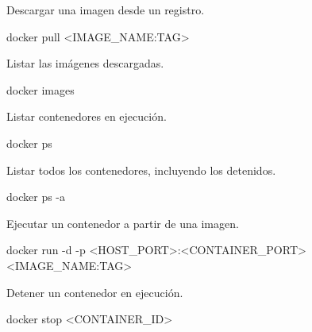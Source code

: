 \documentclass[
  a4paper,
  DIV=11,
  numbers=noendperiod,
  onepage,
  openany]{scrreprt}
\newenvironment{Shaded}{\begin{snugshade}}{\end{snugshade}}
\newcommand{\AttributeTok}[1]{\textcolor[rgb]{0.40,0.45,0.13}{#1}}
\newcommand{\ExtensionTok}[1]{\textcolor[rgb]{0.00,0.23,0.31}{#1}}
\newcommand{\NormalTok}[1]{\textcolor[rgb]{0.00,0.23,0.31}{#1}}
\newcommand{\OperatorTok}[1]{\textcolor[rgb]{0.37,0.37,0.37}{#1}}
\begin{document}
Descargar una imagen desde un registro.

\begin{Shaded}
\begin{Highlighting}[]
\ExtensionTok{docker}\NormalTok{ pull }\OperatorTok{\textless{}}\NormalTok{IMAGE\_NAME:TAG}\OperatorTok{\textgreater{}}
\end{Highlighting}
\end{Shaded}

Listar las imágenes descargadas.

\begin{Shaded}
\begin{Highlighting}[]
\ExtensionTok{docker}\NormalTok{ images}
\end{Highlighting}
\end{Shaded}

Listar contenedores en ejecución.

\begin{Shaded}
\begin{Highlighting}[]
\ExtensionTok{docker}\NormalTok{ ps}
\end{Highlighting}
\end{Shaded}

Listar todos los contenedores, incluyendo los detenidos.

\begin{Shaded}
\begin{Highlighting}[]
\ExtensionTok{docker}\NormalTok{ ps }\AttributeTok{{-}a}
\end{Highlighting}
\end{Shaded}

Ejecutar un contenedor a partir de una imagen.

\begin{Shaded}
\begin{Highlighting}[]
\ExtensionTok{docker}\NormalTok{ run }\AttributeTok{{-}d} \AttributeTok{{-}p} \OperatorTok{\textless{}}\NormalTok{HOST\_PORT}\OperatorTok{\textgreater{}}\NormalTok{:}\OperatorTok{\textless{}}\NormalTok{CONTAINER\_PORT}\OperatorTok{\textgreater{}} \OperatorTok{\textless{}}\NormalTok{IMAGE\_NAME:TAG}\OperatorTok{\textgreater{}}
\end{Highlighting}
\end{Shaded}

Detener un contenedor en ejecución.

\begin{Shaded}
\begin{Highlighting}[]
\ExtensionTok{docker}\NormalTok{ stop }\OperatorTok{\textless{}}\NormalTok{CONTAINER\_ID}\OperatorTok{\textgreater{}}
\end{Highlighting}
\end{Shaded}
\end{document}
